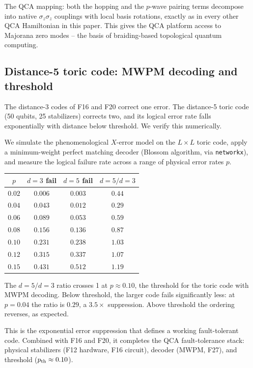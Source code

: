 \documentclass[11pt,aps,prl,twocolumn]{revtex4-2}
\begin{document}
The QCA mapping: both the hopping and the $p$-wave pairing
terms decompose into native $\sigma_z \sigma_z$ couplings with
local basis rotations, exactly as in every other QCA Hamiltonian
in this paper.  This gives the QCA platform access to Majorana
zero modes -- the basis of braiding-based topological quantum
computing.


\subsection{Distance-5 toric code: MWPM decoding and threshold}

The distance-3 codes of F16 and F20 correct one error.  The
distance-5 toric code (50 qubits, 25 stabilizers) corrects two,
and its logical error rate falls exponentially with distance
below threshold.  We verify this numerically.

We simulate the phenomenological $X$-error model on the
$L \times L$ toric code, apply a minimum-weight perfect matching
decoder (Blossom algorithm, via \texttt{networkx}), and measure
the logical failure rate across a range of physical error
rates $p$.

\begin{center}
\begin{tabular}{cccc}
\hline
$p$ & $d=3$ fail & $d=5$ fail & $d=5/d=3$ \\
\hline
$0.02$ & $0.006$ & $0.003$ & $0.44$ \\
$0.04$ & $0.043$ & $0.012$ & $0.29$ \\
$0.06$ & $0.089$ & $0.053$ & $0.59$ \\
$0.08$ & $0.156$ & $0.136$ & $0.87$ \\
$0.10$ & $0.231$ & $0.238$ & $1.03$ \\
$0.12$ & $0.315$ & $0.337$ & $1.07$ \\
$0.15$ & $0.431$ & $0.512$ & $1.19$ \\
\hline
\end{tabular}
\end{center}

The $d=5/d=3$ ratio crosses 1 at $p \approx 0.10$, the
threshold for the toric code with MWPM decoding.  Below
threshold, the larger code fails significantly less: at
$p = 0.04$ the ratio is $0.29$, a $3.5\times$ suppression.
Above threshold the ordering reverses, as expected.

This is the exponential error suppression that defines a
working fault-tolerant code.  Combined with F16 and F20, it
completes the QCA fault-tolerance stack: physical stabilizers
(F12 hardware, F16 circuit), decoder (MWPM, F27), and threshold
($p_{\rm th} \approx 0.10$).
\end{document}
